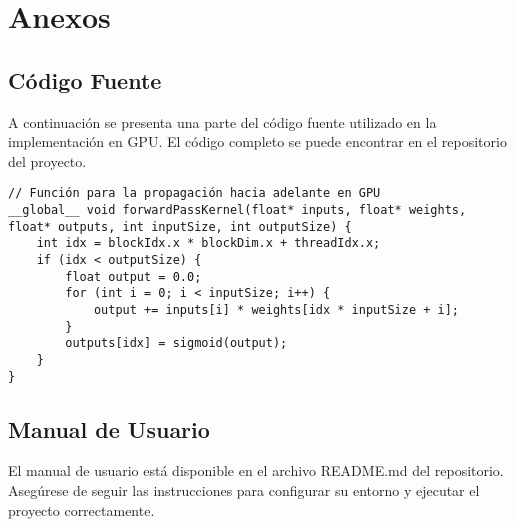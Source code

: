 \documentclass[12pt]{article}
\begin{document}
\section{Anexos}
\subsection{Código Fuente}
A continuación se presenta una parte del código fuente utilizado en la implementación en GPU. El código completo se puede encontrar en el repositorio del proyecto.

\begin{verbatim}
// Función para la propagación hacia adelante en GPU
__global__ void forwardPassKernel(float* inputs, float* weights, float* outputs, int inputSize, int outputSize) {
    int idx = blockIdx.x * blockDim.x + threadIdx.x;
    if (idx < outputSize) {
        float output = 0.0;
        for (int i = 0; i < inputSize; i++) {
            output += inputs[i] * weights[idx * inputSize + i];
        }
        outputs[idx] = sigmoid(output);
    }
}
\end{verbatim}

\subsection{Manual de Usuario}
El manual de usuario está disponible en el archivo README.md del repositorio. Asegúrese de seguir las instrucciones para configurar su entorno y ejecutar el proyecto correctamente.
\end{document}
